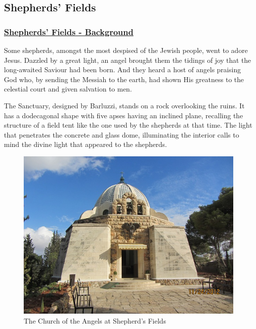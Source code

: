 \documentclass[letterpaper]{report}
\begin{document}
\subsection{Shepherds' Fields}
\begin{multicols}{2}

\subsubsection{\href{http://www.custodia.org/default.asp?id=1888}{
Shepherds' Fields - Background}}

Some shepherds, amongst the most despised of the Jewish people,
went to adore Jesus. Dazzled by a great light,
an angel brought them the tidings of joy that the long-awaited Saviour had
been born.
And they heard a host of angels praising God who,
by sending the Messiah to the earth,
had shown His greatness to the celestial court and given salvation to men.

The Sanctuary, designed by Barluzzi, stands on a rock overlooking the ruins.
It has a dodecagonal shape with five apses having an inclined plane,
recalling the structure of a field tent like the one used by the shepherds at 
that time.
The light that penetrates the concrete and glass dome,
illuminating the interior calls to mind the divine light that appeared to the 
shepherds.

\begin{figure}[H]
\centering
\label{fig:ChurchOfTheAngelsAtShepherdsFields}
\caption{The Church of the Angels at Shepherd's Fields}
\includegraphics[width=\columnwidth]{ChurchOfTheAngelsAtShepherdsFields}
\end{figure}

\end{multicols}
\end{document}
